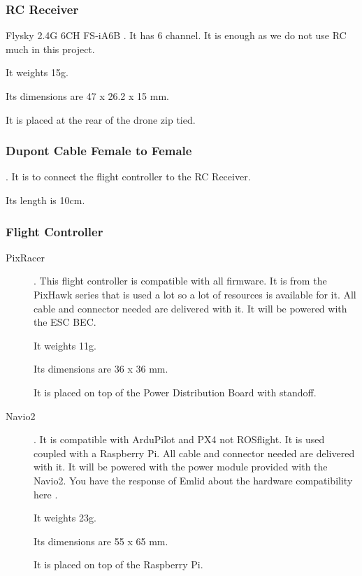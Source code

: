 \subsubsection{RC Receiver}
Flysky 2.4G 6CH FS-iA6B \cite{bangood_receiver}. It has 6 channel. It is enough as we do not use RC much in this project.

It weights 15g.

Its dimensions are 47 x 26.2 x 15 mm.

It is placed at the rear of the drone zip tied.

\subsubsection{Dupont Cable Female to Female}
\cite{bangood_dupont_cable}. It is to connect the flight controller to the RC Receiver.

Its length is 10cm.

\subsubsection{Flight Controller}
\begin{description}
    \item[PixRacer] \cite{mrobotics_pixracer}. This flight controller is compatible with all firmware. It is from the PixHawk series that is used a lot so a lot of resources is available for it. All cable and connector needed are delivered with it. It will be powered with the ESC BEC.

          It weights 11g.

          Its dimensions are 36 x 36 mm.

          It is placed on top of the Power Distribution Board with standoff.

    \item[Navio2] \cite{emlid_navio2}. It is compatible with ArduPilot and PX4 not ROSflight. It is used coupled with a Raspberry Pi. All cable and connector needed are delivered with it. It will be powered with the power module \cite{emlid_power_module} provided with the Navio2. You have the response of Emlid about the hardware compatibility here \cite{emlid_rpi_compatibility}.

          It weights 23g.

          Its dimensions are 55 x 65 mm.

          It is placed on top of the Raspberry Pi.
\end{description}

